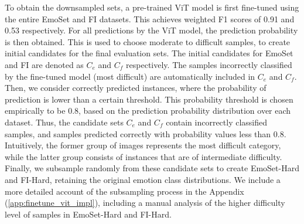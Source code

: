 To obtain the downsampled sets, a pre-trained ViT model \cite{dosovitskiy2020vit} is first fine-tuned using the entire EmoSet and FI datasets. This achieves weighted F1 scores of 0.91 and 0.53 respectively. For all predictions by the ViT model, the prediction probability is then obtained. This is used to choose moderate to difficult samples, to create initial candidates for the final evaluation sets. The initial candidates for EmoSet and FI are denoted as \(C_e\) and \(C_f\) respectively. The samples incorrectly classified by the fine-tuned model (most difficult) are automatically included in \(C_e\) and \(C_f\). Then, we consider correctly predicted instances, where the probability of prediction is lower than a certain threshold. This probability threshold is chosen empirically to be 0.8, based on the prediction probability distribution over each dataset. Thus, the candidate sets \(C_e\) and \(C_f\) contain incorrectly classified samples, and samples predicted correctly with probability values less than 0.8. Intuitively, the former group of images represents the most difficult category, while the latter group consists of instances that are of intermediate difficulty. Finally, we subsample randomly from these candidate sets to create EmoSet-Hard and FI-Hard, retaining the original emotion class distributions. We include a more detailed account of the subsampling process in the Appendix (\ref{app:finetune_vit_impl}), including a manual analysis of the higher difficulty level of samples in EmoSet-Hard and FI-Hard.
